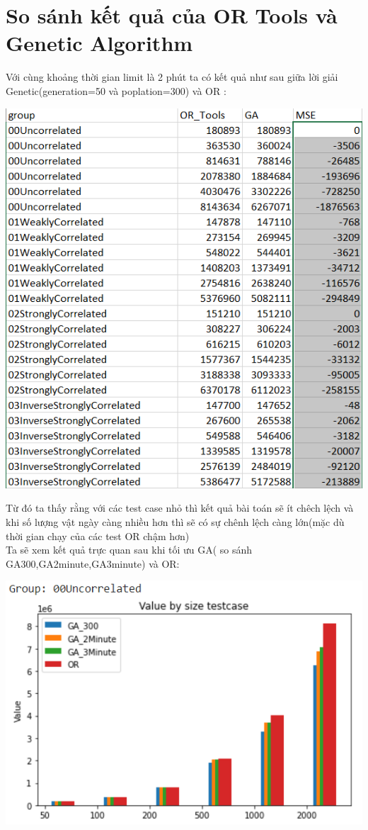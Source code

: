 \documentclass{article}
\begin{document}
\section{So sánh kết quả của OR Tools và Genetic Algorithm}
Với cùng khoảng thời gian limit là 2 phút ta có kết quả như sau giữa lời giải Genetic(generation=50 và poplation=300) và OR :
\begin{center}
    \centering
    \includegraphics[width=15cm]{image/report14.png}
\end{center}
Từ đó ta thấy rằng với các test case nhỏ thì kết quả bài toán sẽ ít chêch lệch và khi số lượng vật ngày càng nhiều hơn thì sẽ có sự chênh lệch càng lớn(mặc dù thời gian chạy của các test OR chậm hơn)
\\
Ta sẽ xem kết quả trực quan sau khi tối ưu GA( so sánh GA300,GA2minute,GA3minute) và OR:
\begin{center}
    \centering
    \includegraphics[width=15cm]{image/AI13.png}
\end{center}
\end{document}
